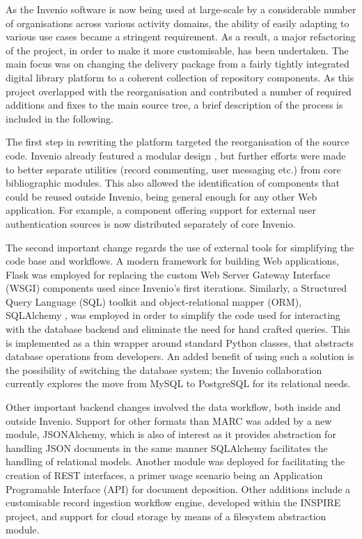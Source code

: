 
As the Invenio software is now being used at large-scale by a considerable
number of organisations across various activity domains, the ability of easily
adapting to various use cases became a stringent requirement. As a result, a
major refactoring of the project, in order to make it more customisable, has
been undertaken. The main focus was on changing the delivery package from a
fairly tightly integrated digital library platform to a coherent collection of
repository components. As this project overlapped with the reorganisation and
contributed a number of required additions and fixes to the main source tree, a
brief description of the process is included in the following.

The first step in rewriting the platform targeted the reorganisation of the
source code. Invenio already featured a modular design \cite{ref:lemeur}, but
further efforts were made to better separate utilities (record commenting, user
messaging etc.) from core bibliographic modules. This also allowed the
identification of components that could be reused outside Invenio, being
general enough for any other Web application. For example, a component offering
support for external user authentication sources is now distributed separately
of core Invenio.

The second important change regards the use of external tools for simplifying
the code base and workflows. A modern framework for building Web applications,
Flask \cite{ref:flask} was employed for replacing the custom Web Server Gateway
Interface (WSGI) components used since Invenio's first iterations. Similarly, a
Structured Query Language (SQL) toolkit and object-relational mapper (ORM),
SQLAlchemy \cite{ref:sqlalchemy}, was employed in order to simplify the code
used for interacting with the database backend and eliminate the need for hand
crafted queries. This is implemented as a thin wrapper around standard Python
classes, that abstracts database operations from developers. An added benefit
of using such a solution is the possibility of switching the database system;
the Invenio collaboration currently explores the move from MySQL to PostgreSQL
for its relational needs.

Other important backend changes involved the data workflow, both inside and
outside Invenio. Support for other formats than MARC was added by a new module,
JSONAlchemy, which is also of interest as it provides abstraction for handling
JSON documents in the same manner SQLAlchemy facilitates the handling of
relational models. Another module was deployed for facilitating the creation of
REST interfaces, a primer usage scenario being an Application Programable
Interface (API) for document deposition.  Other additions include a customisable
record ingestion workflow engine, developed within the INSPIRE project, and
support for cloud storage by means of a filesystem abstraction module.

